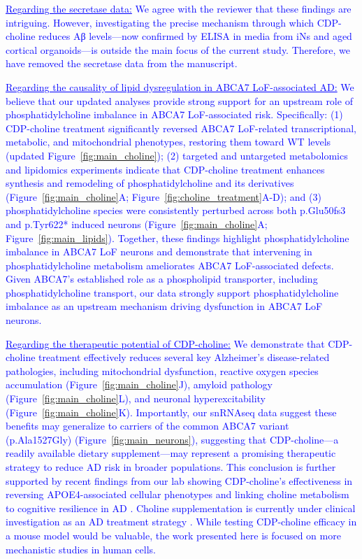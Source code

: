 \textcolor{blue}{\underline{Regarding the secretase data:} We agree with the reviewer that these findings are intriguing. However, investigating the precise mechanism through which CDP-choline reduces Aβ levels—now confirmed by ELISA in media from iNs and aged cortical organoids—is outside the main focus of the current study. Therefore, we have removed the secretase data from the manuscript.}

\textcolor{blue}{\underline{Regarding the causality of lipid dysregulation in ABCA7 LoF-associated AD:} We believe that our updated analyses provide strong support for an upstream role of phosphatidylcholine imbalance in ABCA7 LoF-associated risk. Specifically: (1) CDP-choline treatment significantly reversed ABCA7 LoF-related transcriptional, metabolic, and mitochondrial phenotypes, restoring them toward WT levels (updated Figure~\ref{fig:main_choline}); (2) targeted and untargeted metabolomics and lipidomics experiments indicate that CDP-choline treatment enhances synthesis and remodeling of phosphatidylcholine and its derivatives (Figure~\ref{fig:main_choline}A; Figure~\ref{fig:choline_treatment}A-D); and (3) phosphatidylcholine species were consistently perturbed across both p.Glu50fs3 and p.Tyr622* induced neurons (Figure~\ref{fig:main_choline}A; Figure~\ref{fig:main_lipids}). Together, these findings highlight phosphatidylcholine imbalance in ABCA7 LoF neurons and demonstrate that intervening in phosphatidylcholine metabolism ameliorates ABCA7 LoF-associated defects. Given ABCA7’s established role as a phospholipid transporter, including phosphatidylcholine transport, our data strongly support phosphatidylcholine imbalance as an upstream mechanism driving dysfunction in ABCA7 LoF neurons.}

\textcolor{blue}{\underline{Regarding the therapeutic potential of CDP-choline:} We demonstrate that CDP-choline treatment effectively reduces several key Alzheimer’s disease-related pathologies, including mitochondrial dysfunction, reactive oxygen species accumulation (Figure~\ref{fig:main_choline}J), amyloid pathology (Figure~\ref{fig:main_choline}L), and neuronal hyperexcitability (Figure~\ref{fig:main_choline}K). Importantly, our snRNAseq data suggest these benefits may generalize to carriers of the common ABCA7 variant (p.Ala1527Gly) (Figure~\ref{fig:main_neurons}), suggesting that CDP-choline—a readily available dietary supplement—may represent a promising therapeutic strategy to reduce AD risk in broader populations. This conclusion is further supported by recent findings from our lab showing CDP-choline’s effectiveness in reversing APOE4-associated cellular phenotypes \cite{Sienski2021-zt} and linking choline metabolism to cognitive resilience in AD \cite{Mathys2024-ex}. Choline supplementation is currently under clinical investigation as an AD treatment strategy \cite{Cummings2024-cu}. While testing CDP-choline efficacy in a mouse model would be valuable, the work presented here is focused on more mechanistic studies in human cells.}

